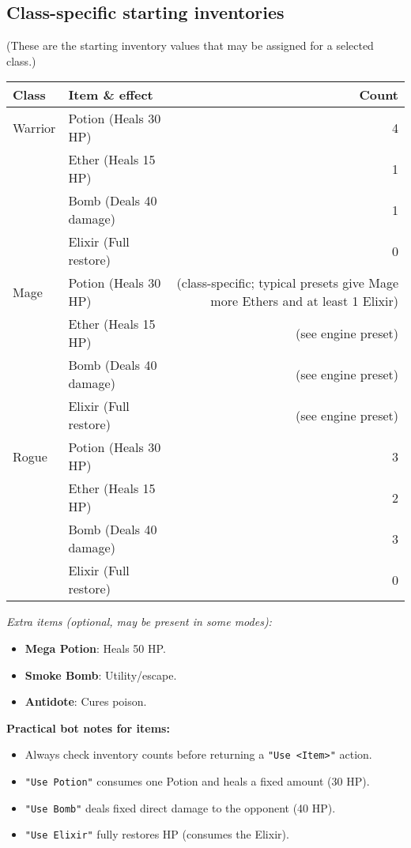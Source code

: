 \documentclass[11pt]{article}
\begin{document}
\subsection{Class-specific starting inventories}
(These are the starting inventory values that may be assigned for a selected class.)

\begin{longtable}{@{}lp{7cm}r@{}}
\toprule
\textbf{Class} & \textbf{Item \& effect} & \textbf{Count} \\
\midrule
Warrior & Potion (Heals 30 HP) & 4 \\
 & Ether (Heals 15 HP) & 1 \\
 & Bomb (Deals 40 damage) & 1 \\
 & Elixir (Full restore) & 0 \\
\addlinespace
Mage & Potion (Heals 30 HP) & (class-specific; typical presets give Mage more Ethers and at least 1 Elixir) \\
 & Ether (Heals 15 HP) & (see engine preset) \\
 & Bomb (Deals 40 damage) & (see engine preset) \\
 & Elixir (Full restore) & (see engine preset) \\
\addlinespace
Rogue & Potion (Heals 30 HP) & 3 \\
 & Ether (Heals 15 HP) & 2 \\
 & Bomb (Deals 40 damage) & 3 \\
 & Elixir (Full restore) & 0 \\
\bottomrule
\end{longtable}

\textit{Extra items (optional, may be present in some modes):}
\begin{itemize}
  \item \textbf{Mega Potion}: Heals 50 HP.
  \item \textbf{Smoke Bomb}: Utility/escape.
  \item \textbf{Antidote}: Cures poison.
\end{itemize}

\noindent \textbf{Practical bot notes for items:}
\begin{itemize}
  \item Always check inventory counts before returning a \texttt{"Use <Item>"} action.
  \item \texttt{"Use Potion"} consumes one Potion and heals a fixed amount (30 HP).
  \item \texttt{"Use Bomb"} deals fixed direct damage to the opponent (40 HP).
  \item \texttt{"Use Elixir"} fully restores HP (consumes the Elixir).
\end{itemize}
\end{document}
